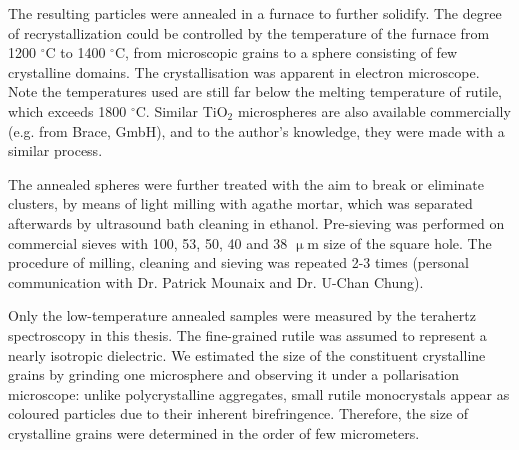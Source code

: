 The resulting particles were annealed in a furnace to further solidify. The degree of recrystallization could be controlled by the temperature of the furnace from 1200  $^{\circ}$C to 1400 $^{\circ}$C, from microscopic grains to a sphere consisting of few crystalline domains. The crystallisation was apparent in electron microscope. Note the temperatures used are still far below the melting temperature of rutile, which exceeds 1800 $^{\circ}$C.
Similar TiO$_{2}$ microspheres are also available commercially (e.g. from Brace, GmbH), and to the author's knowledge, they were made with a similar process.

The annealed spheres were further treated with the aim to break or eliminate clusters, by means of light milling with agathe mortar, which was separated afterwards by ultrasound bath cleaning in ethanol. Pre-sieving was performed on commercial sieves with 100, 53, 50, 40 and 38 $\upmu$m size of the square hole. The procedure of milling, cleaning and sieving was repeated 2-3 times (personal communication with Dr. Patrick Mounaix and {Dr.} U-Chan Chung).

Only the low-temperature annealed samples were measured by the terahertz spectroscopy in this thesis. The fine-grained rutile was assumed to represent a nearly isotropic dielectric. We estimated the size of the constituent crystalline grains by grinding one microsphere and observing it under a pollarisation microscope: unlike polycrystalline aggregates, small rutile monocrystals appear as coloured particles due to their inherent birefringence. Therefore, the size of crystalline grains were determined in the order of few micrometers.



